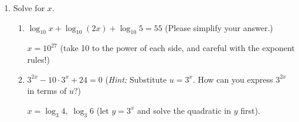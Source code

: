 \documentclass{article}
\begin{document}
\begin{enumerate}
\begin{enumerate}
  \item

    \begin{grading}
      2 points: 0.5 for knowing to switch $x$ and $y$, 1.5 for correctly solving for $y$ (give partial credit if they make partial progress)
    \end{grading}

    \begin{problem}[\vfill\newpage]
      Find a formula for $f^{-1}(x)$.
    \end{problem}

    \begin{solution}
      We start with $y = \frac{\ln(\sqrt{3y})}{2}+3$, switch $x$ and $y$ (since an inverse function switches the input and output), and solve for $y$:
      \begin{align*}
        x &= \frac{\ln(\sqrt{3y})}{2}+3 \\
        x-3  &=  \frac{\ln(\sqrt{3y})}{2} \\
        2(x-3)  &=  \ln(\sqrt{3y})  \\
        e^{2(x-3)} &= \sqrt{3y} \\
        e^{4(x-3)}  &=  3y \\
        \boxed{\frac{e^{4(x-3) } }{3}} &= y
      \end{align*} 
    \end{solution}

  \end{enumerate}

\item  Solve for $x$.
  \begin{enumerate}
  \item
    \begin{problem}[\vfill]
      $ \log_{10} x + \log_{10} (2x) + \log_{10} 5 = 55$ (Please simplify your answer.) 
    \end{problem}

    \begin{solution}
      $ x=10^{27}$ (take 10 to the power of each side, and careful with the exponent rules!)
    \end{solution}

  \item
    \begin{problem}[\vfill]
      $ 3^{2x} - 10 \cdot 3^{x} + 24 = 0 $ (\emph{Hint:} Substitute $u = 3^x$. How can you express $3^{2x}$ in terms of $u$?) 
    \end{problem}

    \begin{solution}
      $x=\log_3 4, \; \log_3 6 $ (let $y=3^x$ and solve the quadratic in $y$ first).
    \end{solution}


\end{enumerate}
\end{enumerate}
\end{document}
